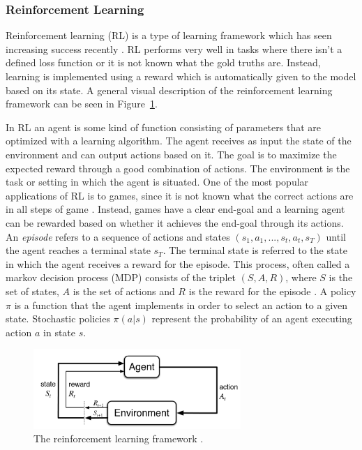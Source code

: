 \documentclass[12pt]{article}
\begin{document}
\subsubsection{Reinforcement Learning} \label{sssec:RL}
Reinforcement learning (RL) \cite{Sutton:1998} is a type of learning framework which has seen increasing success recently \cite{Mnih:2013,Mnih:2015,Silver:2016}. RL performs very well in tasks where there isn't a defined loss function or it is not known what the gold truths are. Instead, learning is implemented using a reward which is automatically given to the model based on its state. A general visual description of the reinforcement learning framework can be seen in Figure~\ref{fig:RL}.

In RL an agent is some kind of function consisting of parameters that are optimized with a learning algorithm. The agent receives as input the state of the environment and can output actions based on it. The goal is to maximize the expected reward through a good combination of actions. The environment is the task or setting in which the agent is situated. One of the most popular applications of RL is to games, since it is not known what the correct actions are in all steps of game \cite{Mnih:2013}. Instead, games have a clear end-goal and a learning agent can be rewarded based on whether it achieves the end-goal through its actions. An \textit{episode} refers to a sequence of actions and states \((s_1,a_1,...,s_t,a_t,s_T)\) until the agent reaches a terminal state \(s_T\). The terminal state is referred to the state in which the agent receives a reward for the episode. This process, often called a markov decision process (MDP) consists of the triplet \((S,A,R)\), where \(S\) is the set of states, \(A\) is the set of actions and \(R\) is the reward for the episode \cite{Kandasamy:2017}. A policy \(\pi\) is a function that the agent implements in order to select an action to a given state. Stochastic policies \(\pi(a|s)\) represent the probability of an agent executing action \(a\) in state \(s\).

\begin{figure}[H]
	\centering
	\includegraphics[width=0.7\textwidth]{pics/RL.png}
	\caption{The reinforcement learning framework \cite{Sutton:1998}.}
	\label{fig:RL}
\end{figure}
\end{document}

